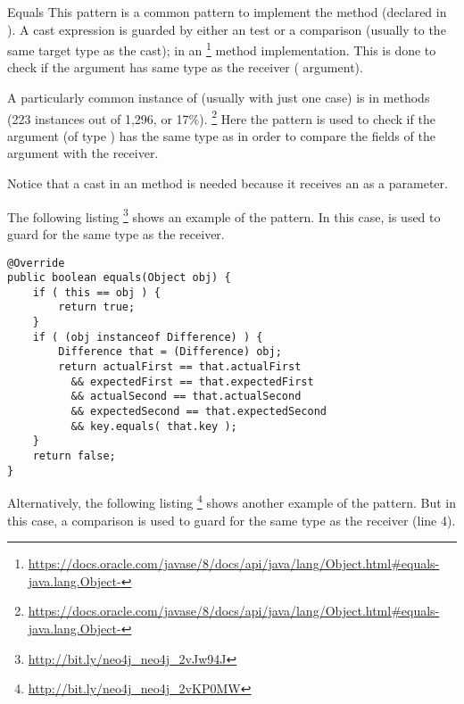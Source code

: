 \begin{pattern}{Equals}
This pattern is a common pattern to implement the  method (declared in ).
A cast expression is guarded by either an  test or a  comparison (usually to the same target type as the cast);
in an %
\footnote{\url{https://docs.oracle.com/javase/8/docs/api/java/lang/Object.html\#equals-java.lang.Object-}} method implementation.
This is done to check if the argument has same type as the receiver
( argument).


A particularly common instance of \thisp{} (usually with just one case) is in  methods (223
instances out of 1,296, or 17\%).%
\footnote{\url{https://docs.oracle.com/javase/8/docs/api/java/lang/Object.html\#equals-java.lang.Object-}}
Here the pattern is used to check if the argument (of type ) has the same type as 
in order to compare the fields of the argument with the receiver.



Notice that a cast in an  method is needed because it
receives an  as a parameter.


\instances{}
The following listing%
\footnote{\url{http://bit.ly/neo4j_neo4j_2vJw94J}}
shows an example of the \thisp{} pattern.
In this case,
 is used to guard for the same type as the receiver.

\begin{verbatim}
@Override
public boolean equals(Object obj) {
    if ( this == obj ) {
        return true;
    }
    if ( (obj instanceof Difference) ) {
        Difference that = (Difference) obj;
        return actualFirst == that.actualFirst
          && expectedFirst == that.expectedFirst
          && actualSecond == that.actualSecond 
          && expectedSecond == that.expectedSecond
          && key.equals( that.key );
    }
    return false;
}
\end{verbatim}

Alternatively, the following listing%
\footnote{\url{http://bit.ly/neo4j_neo4j_2vKP0MW}}
shows another example of the \thisp{} pattern.
But in this case,
a  comparison is used to guard for the same type as the receiver (line 4).


\end{pattern}

